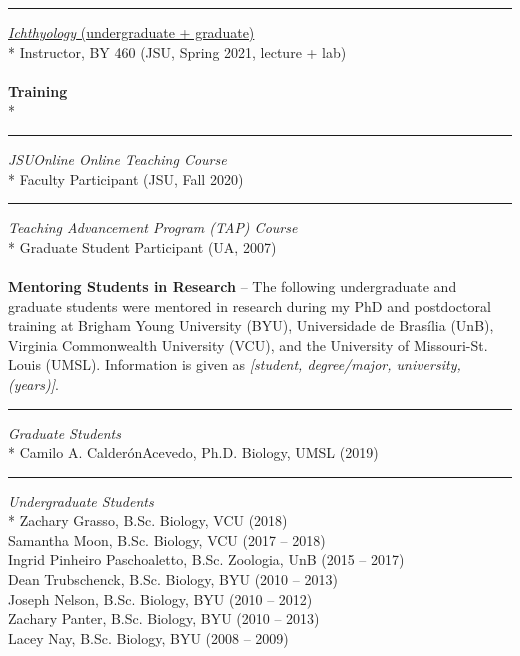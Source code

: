 \documentclass[margin,line]{res}
\begin{document}
\begin{resume}
\rule{-1mm}{5mm} \hspace*{4mm} \href{https://catalog.jsu.edu/undergraduate/science/biology/#programstext}{\textit{Ichthyology} (undergraduate + graduate)}\\*
\hspace*{8mm} Instructor, BY 460 (JSU, Spring 2021, lecture + lab)\\
~\\
\textbf{Training}\\*
\rule{-1mm}{5mm} \hspace*{4mm} {\textit{JSUOnline Online Teaching Course}}\\*
\hspace*{8mm} Faculty Participant (JSU, Fall 2020)\\
\rule{-1mm}{5mm} \hspace*{4mm} {\textit{Teaching Advancement Program (TAP) Course}}\\*
\hspace*{8mm} Graduate Student Participant (UA, 2007)\\
~\\
\textbf{Mentoring Students in Research} -- 
The following undergraduate and graduate students were mentored in research during my PhD and postdoctoral training at Brigham Young University (BYU), Universidade de Bras\'{i}lia (UnB), Virginia Commonwealth University (VCU), and the University of Missouri-St. Louis (UMSL). Information is given as \textit{[student, degree/major, university, (years)]}.~\\
\rule{-1mm}{5mm} \hspace*{4mm} {\textit{Graduate Students}}\\*
\hspace*{8mm} Camilo A. Calder\'{o}n\textendash Acevedo, Ph.D. Biology, UMSL (2019)\\
\rule{-1mm}{5mm} \hspace*{4mm} {\textit{Undergraduate Students}}\\*
\hspace*{8mm} Zachary Grasso, B.Sc. Biology, VCU (2018)\\
\hspace*{8mm} Samantha Moon, B.Sc. Biology, VCU (2017 -- 2018)\\
\hspace*{8mm} Ingrid Pinheiro Paschoaletto, B.Sc. Zoologia, UnB (2015 -- 2017)\\
\hspace*{8mm} Dean Trubschenck, B.Sc. Biology, BYU (2010 -- 2013)\\
\hspace*{8mm} Joseph Nelson, B.Sc. Biology, BYU (2010 -- 2012)\\
\hspace*{8mm} Zachary Panter, B.Sc. Biology, BYU (2010 -- 2013)\\
\hspace*{8mm} Lacey Nay, B.Sc. Biology, BYU (2008 -- 2009)



\end{resume}
\end{document}
